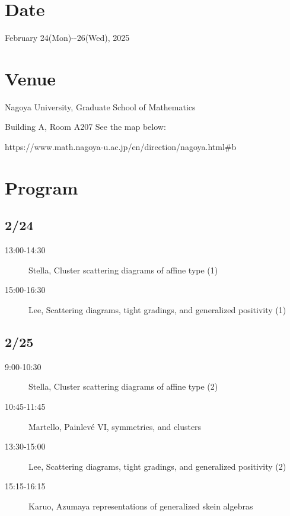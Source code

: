 \documentclass[
]{article}
\author{}
\date{}
\begin{document}
\section*{Date}\label{date}

February 24(Mon)-\/-26(Wed), 2025

\section*{Venue}\label{venue}

Nagoya University, Graduate School of Mathematics

Building A, Room A207 See the map below:

https://www.math.nagoya-u.ac.jp/en/direction/nagoya.html\#b

\section*{Program}\label{program}

\subsection*{2/24}\label{section}

\begin{description}
\item[13:00-14:30]
Stella, Cluster scattering diagrams of affine type (1)
\item[15:00-16:30]
Lee, Scattering diagrams, tight gradings, and generalized positivity (1)
\end{description}

\subsection*{2/25}\label{section-1}

\begin{description}
\item[9:00-10:30]
Stella, Cluster scattering diagrams of affine type (2)
\item[10:45-11:45]
Martello, Painlevé VI, symmetries, and clusters
\item[13:30-15:00]
Lee, Scattering diagrams, tight gradings, and generalized positivity (2)
\item[15:15-16:15]
Karuo, Azumaya representations of generalized skein algebras
\end{description}
\end{document}
